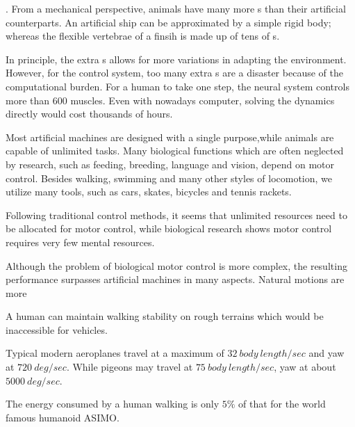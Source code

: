 \begin{itemize}
.
From a mechanical perspective, animals have many more {\dof}s than their artificial counterparts.
An artificial ship can be approximated by a simple rigid body; whereas the flexible vertebrae of a finsih is made up of tens of {\dof}s.


In principle, the extra {\dof}s allows for more variations in adapting the environment. 
However, for the control system, too many extra {\dof}s are a disaster because of the computational burden. 
For a human to take one step,  the neural system controls more than $600$ muscles.
Even with nowadays computer, solving the dynamics directly would cost thousands of hours.

 
Most artificial machines are designed with a single purpose,while animals are capable  of unlimited tasks.
Many biological functions which are often neglected by \cms research, such as feeding, breeding, language and vision, depend on motor control. 
Besides walking, swimming and many other styles of locomotion, we utilize many tools, such as cars, skates, bicycles and tennis rackets.

Following traditional control methods, it seems that unlimited resources need to be  allocated for motor control, while biological research shows motor control requires very few mental resources.

Although the problem of biological motor control is more complex, the resulting performance surpasses artificial machines in many aspects.
Natural motions are more
\begin{enumerate} 

A human can maintain walking stability on rough terrains which would be inaccessible for vehicles.

Typical modern aeroplanes  travel at a maximum of $32\: body\: length/sec$ and yaw at $720\: deg/sec$.
While pigeons may travel at $75 \:body\: length / sec$, yaw at about  $5000 \: deg/sec$.

The energy consumed by a human walking is only $5\%$ of that for the world famous humanoid ASIMO.
\end{enumerate}

\end{itemize}



